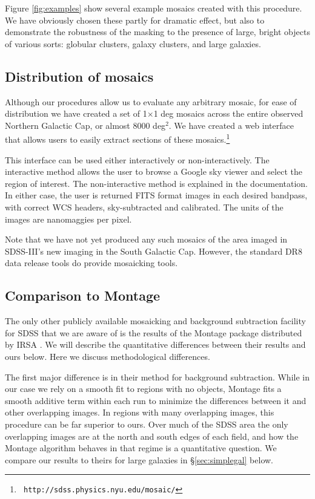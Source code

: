 \documentclass[10pt,preprint]{aastex}
\begin{document}
Figure \ref{fig:examples} show several example mosaics created with
this procedure.  We have obviously chosen these partly for dramatic
effect, but also to demonstrate the robustness of the masking to the
presence of large, bright objects of various sorts: globular clusters,
galaxy clusters, and large galaxies.

\subsection{Distribution of mosaics}
\label{sec:distmosaic}

Although our procedures allow us to evaluate any arbitrary mosaic, for
ease of distribution we have created a set of 1$\times$1 deg mosaics
across the entire observed Northern Galactic Cap, or almost 8000
deg$^2$. We have created a web interface that allows users to easily
extract sections of these mosaics.\footnote{\tt
http://sdss.physics.nyu.edu/mosaic/}

This interface can be used either interactively or
non-interactively. The interactive method allows the user to browse a
Google sky viewer and select the region of interest.  The
non-interactive method is explained in the documentation.  In either
case, the user is returned FITS format images in each desired
bandpass, with correct WCS headers, sky-subtracted and calibrated. The
units of the images are nanomaggies per pixel.

Note that we have not yet produced any such mosaics of the area imaged
in SDSS-III's new imaging in the South Galactic Cap. However, the
standard DR8 data release tools do provide mosaicking tools.

\subsection{Comparison to Montage}

The only other publicly available mosaicking and background
subtraction facility for SDSS that we are aware of is the results of
the Montage package distributed by IRSA
\citep{berriman03a,berriman04a}. We will describe the quantitative
differences between their results and ours below.  Here we discuss
methodological differences.

The first major difference is in their method for background
subtraction. While in our case we rely on a smooth fit to regions with
no objects, Montage fits a smooth additive term within each run to
minimize the differences between it and other overlapping images. In
regions with many overlapping images, this procedure can be far
superior to ours. Over much of the SDSS area the only overlapping
images are at the north and south edges of each field, and how the
Montage algorithm behaves in that regime is a quantitative
question. We compare our results to theirs for large galaxies in
\S\ref{sec:simplegal} below.
\end{document}
